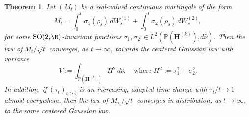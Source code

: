\documentclass[10pt]{amsart}
\theoremstyle{plain}
\newtheorem{thm}{Theorem}[section]
\theoremstyle{definition}
\numberwithin{equation}{subsection}
\newcommand\bP{\mathbb{P}}
\newcommand{\SO}{\mathrm{SO}}
\newcommand{\bfH}{\boldsymbol{H}}
\newcommand{\defeq}{:=}
\begin{document}
\begin{thm}\label{flj:mclt} Let \((M_t)\) be a real-valued continuous martingale of the form
\[
M_t =
\int_0^t \sigma_1(\rho_s) \, dW_s^{(1)} + \int_0^t \sigma_2(\rho_s) \, dW_s^{(2)},
\]
for some $\SO(2, \R)$-invariant functions \(\sigma_1, \sigma_2\ \in L^2(\bP(\bfH^{(k)}), d\hat{\nu})\). Then the law of \(M_t / \sqrt{t}\) converges, as \(t \to \infty\), towards the centered Gaussian law with variance
\[
V\defeq \int_{\bP(\bfH^{(k)})} H^2 \, d\hat\nu, \quad \text{where } H^2 := \sigma_1^2+\sigma_2^2.
\]
In addition, if \((\tau_t)_{t \geq 0} \) is an increasing, adapted time change with \(\tau_t/t \to 1 \) almost everywhere,
then the law of \(M_{\tau_t} / \sqrt{t}\) converges in distribution, as \(t \to \infty\), to the same centered Gaussian law.

\end{thm}
\end{document}
